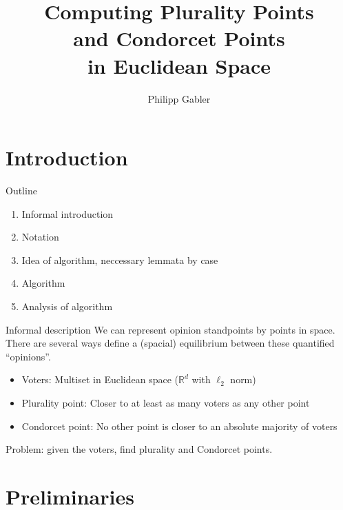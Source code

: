 \documentclass{beamer}
\author{Philipp Gabler}
\title[Plurality Points\\ and Condorcet Points\\ in Euclidean Space]{%
  Computing Plurality Points\\ and Condorcet Points\\ in Euclidean Space}
\date{}
\newcommand{\RR}{\mathbb{R}}
\begin{document}
\beamertemplatenavigationsymbolsempty

\begin{frame}
  \maketitle
\end{frame}

\section{Introduction}

\begin{frame}{Outline}
  \begin{enumerate}
  \item Informal introduction
  \item Notation
  \item Idea of algorithm, neccessary lemmata by case
  \item Algorithm
  \item Analysis of algorithm
  \end{enumerate}
\end{frame}

\begin{frame}{Informal description}
  We can represent opinion standpoints by points in space.  There are several ways define a
  (spacial) equilibrium between these quantified \enquote{opinions}.
  
  \begin{itemize}
  \item Voters: Multiset in Euclidean space (\(\RR^d\) with \(\ell_2\) norm)
  \item Plurality point: Closer to at least as many voters as any other point
  \item Condorcet point: No other point is closer to an absolute majority of voters
  \end{itemize}

  Problem: given the voters, find plurality and Condorcet points.
\end{frame}


\section{Preliminaries}
\end{document}
